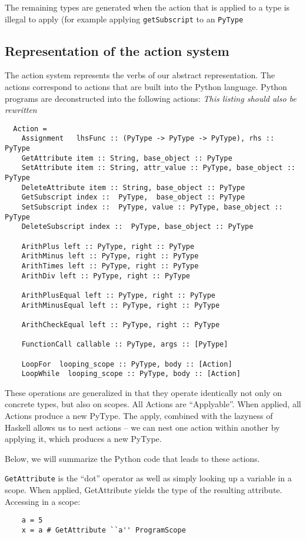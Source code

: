 \documentclass{article}[12pt]
\begin{document}
The remaining types are generated when the action that is applied to a type is illegal to apply (for
example applying \verb=getSubscript= to an \verb=PyType=

\subsection{Representation of the action system}
The action system represents the verbs of our abstract representation. The actions correspond to
actions that are built into the Python language. Python programs are
deconstructed into the following actions:
\emph{This listing should also be rewritten}
\begin{verbatim}
  Action =
    Assignment   lhsFunc :: (PyType -> PyType -> PyType), rhs :: PyType
    GetAttribute item :: String, base_object :: PyType 
    SetAttribute item :: String, attr_value :: PyType, base_object :: PyType 
    DeleteAttribute item :: String, base_object :: PyType
    GetSubscript index ::  PyType,  base_object :: PyType 
    SetSubscript index ::  PyType, value :: PyType, base_object :: PyType 
    DeleteSubscript index ::  PyType, base_object :: PyType 

    ArithPlus left :: PyType, right :: PyType 
    ArithMinus left :: PyType, right :: PyType 
    ArithTimes left :: PyType, right :: PyType
    ArithDiv left :: PyType, right :: PyType 

    ArithPlusEqual left :: PyType, right :: PyType
    ArithMinusEqual left :: PyType, right :: PyType

    ArithCheckEqual left :: PyType, right :: PyType

    FunctionCall callable :: PyType, args :: [PyType]

    LoopFor  looping_scope :: PyType, body :: [Action]
    LoopWhile  looping_scope :: PyType, body :: [Action]
\end{verbatim}

These operations are generalized in that they operate identically not only on concrete types, but
also on scopes. All Actions are ``Applyable''. When applied, all Actions produce a new PyType. The apply, combined with
the lazyness of Haskell allows us to nest actions -- we can nest one action within another by applying it, which
produces a new PyType.

Below, we will summarize the Python code that leads to these actions.

\verb=GetAttribute= is the ``dot'' operator as well as simply looking up a variable in a scope. When
applied, GetAttribute yields the type of the resulting attribute.
Accessing in a scope:
\begin{verbatim}
    a = 5
    x = a # GetAttribute ``a'' ProgramScope
\end{verbatim}
\end{document}
